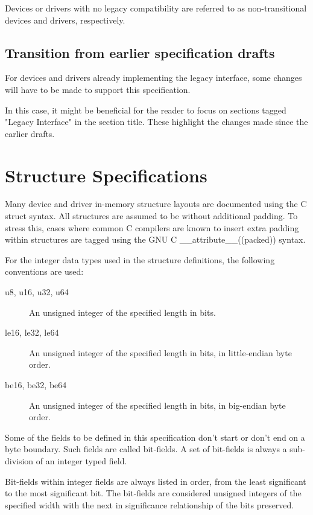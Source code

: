 Devices or drivers with no legacy compatibility are referred to as
non-transitional devices and drivers, respectively.

\subsection{Transition from earlier specification drafts}\label{sec:Transition from earlier specification drafts}

For devices and drivers already implementing the legacy
interface, some changes will have to be made to support this
specification.

In this case, it might be beneficial for the reader to focus on
sections tagged "Legacy Interface" in the section title.
These highlight the changes made since the earlier drafts.

\section{Structure Specifications}\label{sec:Structure Specifications}

Many device and driver in-memory structure layouts are documented using
the C struct syntax. All structures are assumed to be without additional
padding. To stress this, cases where common C compilers are known to insert
extra padding within structures are tagged using the GNU C
__attribute__((packed))  syntax.

For the integer data types used in the structure definitions, the following
conventions are used:

\begin{description}
\item[u8, u16, u32, u64] An unsigned integer of the specified length in bits.

\item[le16, le32, le64] An unsigned integer of the specified length in bits,
in little-endian byte order.

\item[be16, be32, be64] An unsigned integer of the specified length in bits,
in big-endian byte order.
\end{description}

Some of the fields to be defined in this specification don't
start or don't end on a byte boundary. Such fields are called bit-fields.
A set of bit-fields is always a sub-division of an integer typed field.

Bit-fields within integer fields are always listed in order,
from the least significant to the most significant bit.  The
bit-fields are considered unsigned integers of the specified
width with the next in significance relationship of the bits
preserved.

